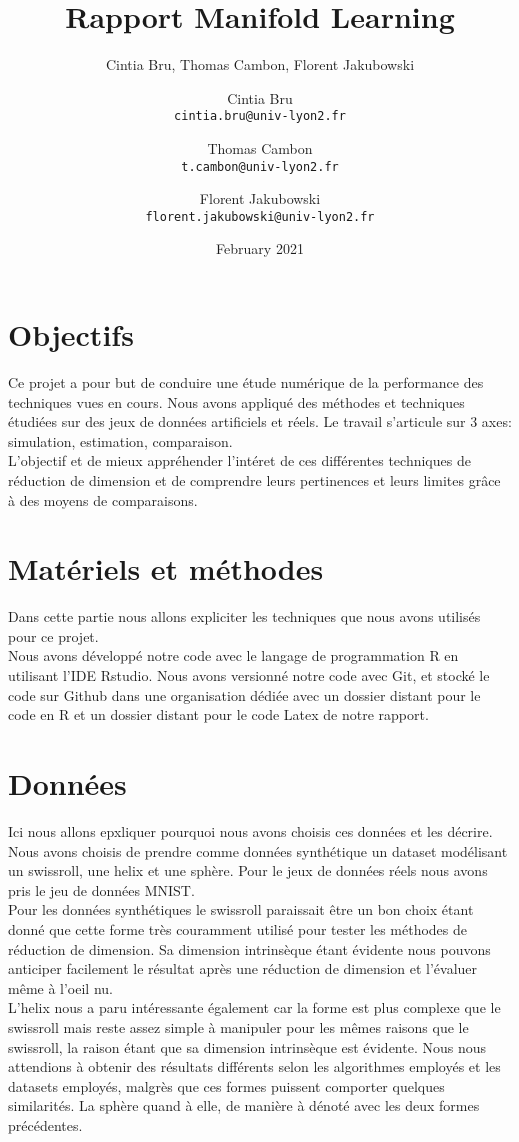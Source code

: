 \documentclass{article}
\title{Rapport Manifold Learning}
\author{Cintia Bru, Thomas Cambon, Florent Jakubowski }
\author{
  Cintia Bru\\
  \texttt{cintia.bru@univ-lyon2.fr}
  \and
  Thomas Cambon\\
  \texttt{t.cambon@univ-lyon2.fr}
  \and
  Florent Jakubowski\\
  \texttt{florent.jakubowski@univ-lyon2.fr}
}
\date{February 2021}
\begin{document}
\maketitle
\tableofcontents

\begin{multicols}{2}
\section{Objectifs}

Ce projet a pour but de conduire une étude numérique de la performance des techniques vues en cours. Nous avons appliqué des méthodes et techniques étudiées sur des jeux de données artificiels et réels. Le travail s’articule sur 3 axes: simulation, estimation, comparaison.\\

L'objectif et de mieux appréhender l'intéret de ces différentes techniques de réduction de dimension et de comprendre leurs pertinences et leurs limites grâce à des moyens de comparaisons.\\

\section{Matériels et méthodes}
Dans cette partie nous allons expliciter les techniques que nous avons utilisés pour ce projet.\\

Nous avons développé notre code avec le langage de programmation R en utilisant l'IDE Rstudio. Nous avons versionné notre code avec Git, et stocké le code sur Github dans une organisation dédiée avec un dossier distant pour le code en R et un dossier distant pour le code Latex de notre rapport.\\
\section{Données}
Ici nous allons epxliquer pourquoi nous avons choisis ces données et les décrire. \\
Nous avons choisis de prendre comme données synthétique un dataset modélisant un swissroll, une helix et une sphère. Pour le jeux de données réels nous avons pris le jeu de données MNIST.\\
Pour les données synthétiques le swissroll paraissait être un bon choix étant donné que cette forme très couramment utilisé pour tester les méthodes de réduction de dimension. Sa dimension intrinsèque étant évidente nous pouvons anticiper facilement le résultat après une réduction de dimension et l'évaluer même à l'oeil nu.\\
L'helix nous a paru intéressante également car la forme est plus complexe que le swissroll mais reste assez simple à manipuler pour les mêmes raisons que le swissroll, la raison étant que sa dimension intrinsèque est évidente. Nous nous attendions à obtenir des résultats différents selon les algorithmes employés et les datasets employés, malgrès que ces formes puissent comporter quelques similarités. 
La sphère quand à elle, de manière à dénoté avec les deux formes précédentes.\\


\end{multicols}
\end{document}
